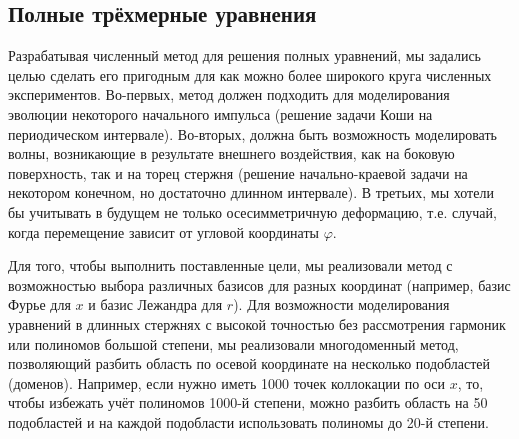 \documentclass[12pt, a4paper]{report}
\begin{document}
\subsection{Полные трёхмерные уравнения}
Разрабатывая численный метод для решения полных уравнений, мы задались целью сделать его пригодным для как можно более широкого круга численных экспериментов. Во-первых, метод должен подходить для моделирования эволюции некоторого начального импульса (решение задачи Коши на периодическом интервале). Во-вторых, должна быть возможность моделировать волны, возникающие в результате внешнего воздействия, как на боковую поверхность, так и на торец стержня (решение начально-краевой задачи на некотором конечном, но достаточно длинном интервале). В третьих, мы хотели бы учитывать в будущем не только осесимметричную деформацию, т.е. случай, когда перемещение зависит от угловой координаты $\varphi$.

Для того, чтобы выполнить поставленные цели, мы реализовали метод с возможностью выбора различных базисов для разных координат (например, базис Фурье для $x$ и базис Лежандра для $r$). Для возможности моделирования уравнений в длинных стержнях с высокой точностью без рассмотрения гармоник или полиномов большой степени, мы реализовали многодоменный метод, позволяющий разбить область по осевой координате на несколько подобластей (доменов). Например, если нужно иметь 1000 точек коллокации по оси $x$, то, чтобы избежать учёт полиномов 1000-й степени, можно разбить область на 50 подобластей и на каждой подобласти использовать полиномы до 20-й степени.
\end{document}
